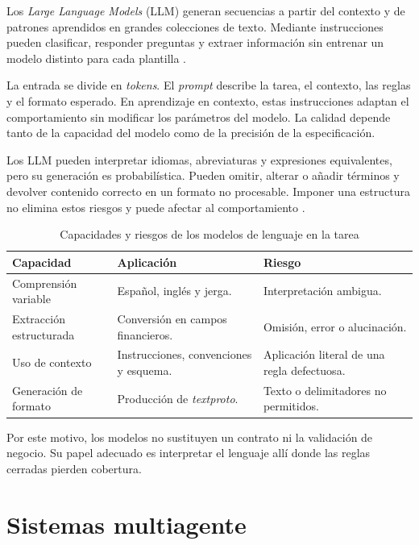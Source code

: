 Los \textit{Large Language Models} (LLM) generan secuencias a partir del contexto y de patrones aprendidos en grandes colecciones de texto. Mediante instrucciones pueden clasificar, responder preguntas y extraer información sin entrenar un modelo distinto para cada plantilla \citep{mialon2024augmented,shah2023finllms}.

La entrada se divide en \textit{tokens}. El \textit{prompt} describe la tarea, el contexto, las reglas y el formato esperado. En aprendizaje en contexto, estas instrucciones adaptan el comportamiento sin modificar los parámetros del modelo. La calidad depende tanto de la capacidad del modelo como de la precisión de la especificación.

Los LLM pueden interpretar idiomas, abreviaturas y expresiones equivalentes, pero su generación es probabilística. Pueden omitir, alterar o añadir términos y devolver contenido correcto en un formato no procesable. Imponer una estructura no elimina estos riesgos y puede afectar al comportamiento \citep{tam2024formatrestrictions}.

\begin{table}[H]
\centering
\small
\caption{Capacidades y riesgos de los modelos de lenguaje en la tarea}
\label{tab:capacidades_limitaciones_llm}
\begin{tabular}{|P{4.0cm}|P{4.4cm}|P{4.4cm}|}
\hline
\textbf{Capacidad} & \textbf{Aplicación} & \textbf{Riesgo} \\
\hline
Comprensión variable & Español, inglés y jerga. & Interpretación ambigua. \\
\hline
Extracción estructurada & Conversión en campos financieros. & Omisión, error o alucinación. \\
\hline
Uso de contexto & Instrucciones, convenciones y esquema. & Aplicación literal de una regla defectuosa. \\
\hline
Generación de formato & Producción de \textit{textproto}. & Texto o delimitadores no permitidos. \\
\hline
\end{tabular}
\end{table}

Por este motivo, los modelos no sustituyen un contrato ni la validación de negocio. Su papel adecuado es interpretar el lenguaje allí donde las reglas cerradas pierden cobertura.

\section{Sistemas multiagente}
\label{sec:sistemas_multiagente}

